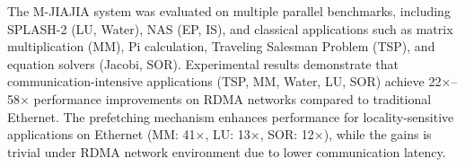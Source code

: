 The M-JIAJIA system was evaluated on multiple parallel benchmarks, including SPLASH-2 (LU, Water), NAS (EP, IS), and classical applications such as matrix multiplication (MM), Pi calculation, Traveling Salesman Problem (TSP), and equation solvers (Jacobi, SOR). Experimental results demonstrate that communication-intensive applications (TSP, MM, Water, LU, SOR) achieve 22×–58× performance improvements on RDMA networks compared to traditional Ethernet. The prefetching mechanism enhances performance for locality-sensitive applications on Ethernet (MM: 41×, LU: 13×, SOR: 12×), while the gains is trivial under RDMA network environment due to lower communication latency.



\pagestyle{enfrontmatterstyle}%
\cleardoublepage\pagestyle{frontmatterstyle}%

